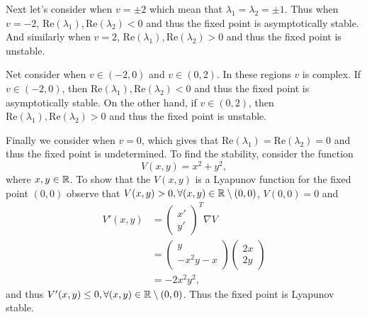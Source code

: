 \documentclass[12pt]{report}
\begin{document}
\begin{solution}
\begin{enumerate}
        Next let's consider when $v = \pm 2$ which mean that $\lambda_1=\lambda_2 = \pm 1$. Thus when $v=-2$, $\text{Re}(\lambda_1),\text{Re}(\lambda_2) < 0$ and thus the fixed point is asymptotically stable. And similarly when $v =2$, $\text{Re}(\lambda_1),\text{Re}(\lambda_2) > 0$ and thus the fixed point is unstable.

        Net consider when $v \in (-2,0)$ and $v \in (0,2)$. In these regions $v$ is complex. If $v \in (-2,0)$, then $\text{Re}(\lambda_1),\text{Re}(\lambda_2) < 0$ and thus the fixed point is asymptotically stable. On the other hand, if $v \in (0,2)$, then $\text{Re}(\lambda_1),\text{Re}(\lambda_2) > 0$ and thus the fixed point is unstable.

        Finally we consider when $v = 0$, which gives that $\text{Re}(\lambda_1) = \text{Re}(\lambda_2) = 0$ and thus the fixed point is undetermined. To find the stability, consider the function
        \[ 
            V(x,y) = x^2 + y^2,
        \]
        where $x,y \in {\mathbb R}$. To show that the $V(x,y)$ is a Lyapunov function for the fixed point $(0,0)$ observe that $V(x,y) > 0, \forall (x,y) \in {\mathbb R}\setminus(0,0)$, $V(0,0) = 0$ and
        \begin{align*}
            V'(x,y) &= \begin{pmatrix}
                x'\\y'
            \end{pmatrix}^T \nabla V \\
            &= \begin{pmatrix}
                y\\ -x^2y - x
            \end{pmatrix}\begin{pmatrix}
                2x\\2y
            \end{pmatrix}\\
            &= -2x^2y^2,
        \end{align*}
        and thus $V'(x,y) \leq 0, \forall (x,y) \in {\mathbb R}\setminus(0,0)$. Thus the fixed point is Lyapunov stable.


    \end{enumerate}
    



\end{solution}

\newpage

\end{document}
